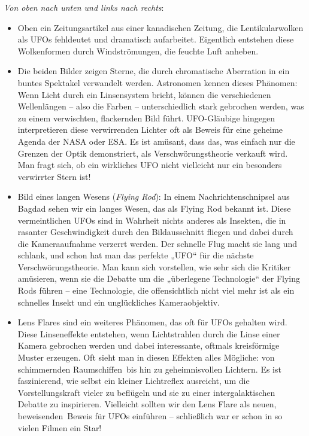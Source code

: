\documentclass{scrartcl}
\begin{document}
\textit{Von oben nach unten und links nach rechts}:

\begin{itemize}
	\item Oben ein Zeitungsartikel aus einer kanadischen Zeitung, die Lentikularwolken als UFOs fehldeutet und dramatisch aufarbeitet. Eigentlich entstehen diese Wolkenformen durch Windströmungen, die feuchte Luft anheben. 

	\item Die beiden Bilder zeigen Sterne, die durch chromatische Aberration in ein buntes Spektakel verwandelt werden. Astronomen kennen dieses Phänomen: Wenn Licht durch ein Linsensystem bricht, können die verschiedenen Wellenlängen – also die Farben – unterschiedlich stark gebrochen werden, was zu einem verwischten, flackernden Bild führt. UFO-Gläubige hingegen interpretieren diese verwirrenden Lichter oft als Beweis für eine geheime Agenda der NASA oder ESA. Es ist amüsant, dass das, was einfach nur die Grenzen der Optik demonstriert, als Verschwörungstheorie verkauft wird. Man fragt sich, ob ein wirkliches UFO nicht vielleicht nur ein besonders verwirrter Stern ist!  
	\item Bild eines langen Wesens (\textit{Flying Rod}): In einem Nachrichtenschnipsel aus Bagdad sehen wir ein langes Wesen, das als Flying Rod bekannt ist. Diese vermeintlichen UFOs sind in Wahrheit nichts anderes als Insekten, die in rasanter Geschwindigkeit durch den Bildausschnitt fliegen und dabei durch die Kameraaufnahme verzerrt werden. Der schnelle Flug macht sie lang und schlank, und schon hat man das perfekte „UFO“ für die nächste Verschwörungstheorie. Man kann sich vorstellen, wie sehr sich die Kritiker amüsieren, wenn sie die Debatte um die „überlegene Technologie“ der Flying Rods führen – eine Technologie, die offensichtlich nicht viel mehr ist als ein schnelles Insekt und ein unglückliches Kameraobjektiv.  
	\item Lens Flares sind ein weiteres Phänomen, das oft für UFOs gehalten wird. Diese Linseneffekte entstehen, wenn Lichtstrahlen durch die Linse einer Kamera gebrochen werden und dabei interessante, oftmals kreisförmige Muster erzeugen. Oft sieht man in diesen Effekten alles Mögliche: von schimmernden \frq Raumschiffen\flq\ bis hin zu geheimnisvollen \flq Lichtern\frq. Es ist faszinierend, wie selbst ein kleiner Lichtreflex ausreicht, um die Vorstellungskraft vieler zu beflügeln und sie zu einer intergalaktischen Debatte zu inspirieren. Vielleicht sollten wir den Lens Flare als neuen, \frq beweisenden\flq\ Beweis für UFOs einführen – schließlich war er schon in so vielen Filmen ein Star! 

\end{itemize}
\end{document}
